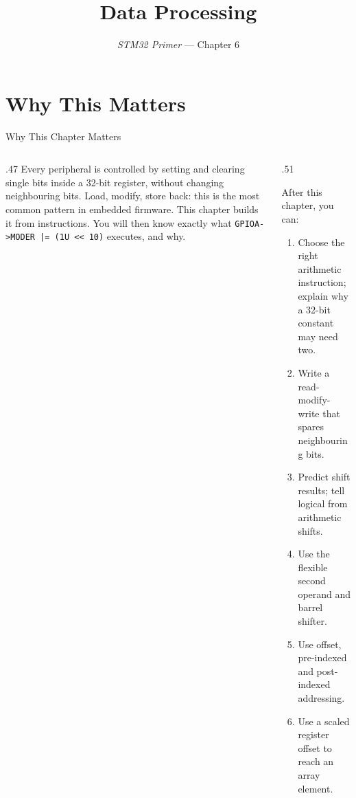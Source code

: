 \documentclass[9pt,aspectratio=169,xcolor=table]{beamer}
\title{Data Processing}
\subtitle{\emph{STM32 Primer} --- Chapter 6}
\begin{document}
\titlepage

\section{Why This Matters}

\begin{frame}[fragile]{Why This Chapter Matters}
    \begin{columns}[c]
    \begin{column}{.47\textwidth}
        {\normalsize Every peripheral is controlled by setting and clearing single bits inside a 32-bit register, without changing neighbouring bits. Load, modify, store back: this is the most common pattern in embedded firmware. This chapter builds it from instructions. You will then know exactly what \verb+GPIOA->MODER |= (1U << 10)+ executes, and why.}
    \end{column}
    \begin{column}{.51\textwidth}
        \begin{block}{After this chapter, you can:}
        {\small
        \begin{enumerate}\itemsep2pt
            \item Choose the right arithmetic instruction; explain why a 32-bit constant may need two.
            \item Write a read-modify-write that spares neighbouring bits.
            \item Predict shift results; tell logical from arithmetic shifts.
            \item Use the flexible second operand and barrel shifter.
            \item Use offset, pre-indexed and post-indexed addressing.
            \item Use a scaled register offset to reach an array element.
        \end{enumerate}}
        \end{block}
    \end{column}
    \end{columns}
\end{frame}
\end{document}

